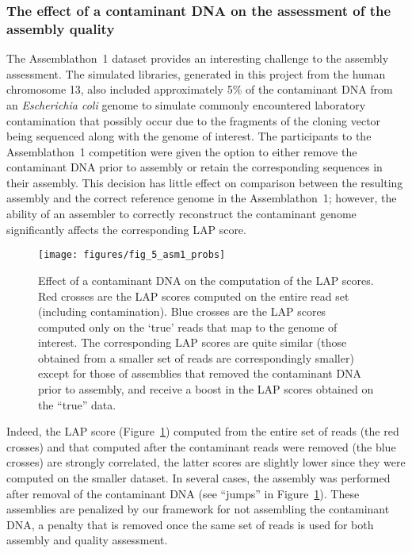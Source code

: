 \subsubsection{The effect of a contaminant DNA on the assessment of
  the assembly quality}
The Assemblathon~1 dataset provides an interesting challenge to the
assembly assessment.  The simulated libraries, generated in this
project from the human chromosome 13, also included approximately 5\%
of the contaminant DNA from an \emph{Escherichia coli} genome to
simulate commonly encountered laboratory contamination that possibly occur due to
the fragments of the cloning vector being sequenced along with the genome
of interest.  The participants to the Assemblathon~1 competition were
given the option to either remove the contaminant DNA prior to
assembly or retain the corresponding sequences in their assembly.
This decision has little effect on comparison between the resulting assembly
and the correct reference genome in the Assemblathon~1;
however, the ability of an assembler to correctly reconstruct the
contaminant genome significantly affects the corresponding LAP
score.

\begin{figure}[ht!]
\begin{center}
 \texttt{[image: figures/fig\_5\_asm1\_probs]}
\end{center}
\renewcommand{\baselinestretch}{1}
\small\normalsize
\begin{quote}
\caption[Effect of a contaminant DNA on the computation of the LAP
    scores.]{Effect of a contaminant DNA on the computation of the LAP
    scores. Red crosses are the LAP scores computed on the entire read
    set (including contamination). Blue crosses are the LAP scores computed only on
    the `true' reads that map to the genome of interest. The
    corresponding LAP scores are quite similar (those obtained from a
    smaller set of reads are correspondingly smaller) except for those of assemblies that removed the contaminant DNA prior
    to assembly, and receive a boost in the LAP scores obtained on the ``true'' data.}
\label{fig:asm1_probs}
\end{quote}
\end{figure}
\renewcommand{\baselinestretch}{2}
\small\normalsize

Indeed, the LAP score (Figure~\ref{fig:asm1_probs})
computed from the entire set of reads (the red crosses) and that computed
after the contaminant reads were removed (the blue crosses) are strongly
correlated, the latter scores are slightly lower since they were computed on the smaller dataset.  In several cases, the assembly was performed
after removal of the contaminant DNA (see ``jumps'' in Figure~\ref{fig:asm1_probs}).  These
assemblies are penalized by our framework for not assembling the
contaminant DNA, a penalty that is removed once the same set of reads is
used for both assembly and quality assessment.

